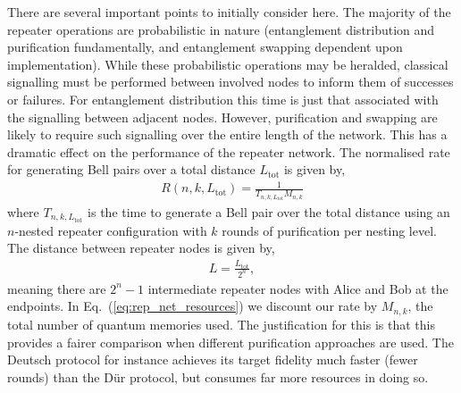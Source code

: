 There are several important points to initially consider here. The majority of the repeater operations are probabilistic in nature (entanglement distribution and purification fundamentally, and entanglement swapping dependent upon implementation). While these probabilistic operations may be heralded, classical signalling must be performed between involved nodes  to inform them of successes or failures. For entanglement distribution this time is just that associated with the signalling between adjacent nodes. However, purification and swapping are likely to require such signalling over the entire length of the network. This has a dramatic effect on the performance of the repeater network. The normalised rate for generating Bell pairs over a total distance $L_\mathrm{tot}$ is given by,
\begin{align}
R(n,k,L_\mathrm{tot})= \frac{1}{T_{n,k,L_\mathrm{tot}} M_{n,k}}
\label{eq:rep_net_resources}
\end{align}
where $T_{n,k,L_\mathrm{tot}}$ is the time to generate a Bell pair over the total distance using an $n$-nested repeater configuration with $k$ rounds of purification per nesting level. The distance between repeater nodes is given by,
\begin{align}
	L=\frac{L_\mathrm{tot}}{2^n},
\end{align}
meaning there are \mbox{$2^n-1$} intermediate repeater nodes with Alice and Bob at the endpoints. In Eq.~(\ref{eq:rep_net_resources}) we discount our rate by $M_{n,k}$, the total number of quantum memories used. The justification for this is that this provides a fairer comparison when different purification approaches are used. The Deutsch protocol for instance achieves its target fidelity much faster (fewer rounds) than the D{\"u}r protocol, but consumes far more resources in doing so.

